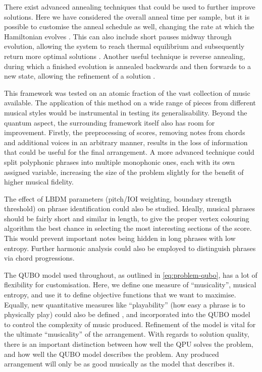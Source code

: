 \documentclass[12pt]{article}
\theoremstyle{definition}
\begin{document}
There exist advanced annealing techniques that could be used to further improve solutions. Here we have considered the overall anneal time per sample, but it is possible to customise the anneal schedule as well, changing the rate at which the Hamiltonian evolves \cite{khezri_customized_2022}. This can also include short pauses midway through evolution, allowing the system to reach thermal equilibrium and subsequently return more optimal solutions \cite{izquierdo_advantage_2022}. Another useful technique is reverse annealing, during which a finished evolution is annealed backwards and then forwards to a new state, allowing the refinement of a solution \cite{dwave_reverse}.

This framework was tested on an atomic fraction of the vast collection of music available. The application of this method on a wide range of pieces from different musical styles would be instrumental in testing its generalisability. Beyond the quantum aspect, the surrounding framework itself also has room for improvement. Firstly, the preprocessing of scores, removing notes from chords and additional voices in an arbitrary manner, results in the loss of information that could be useful for the final arrangement. A more advanced technique could split polyphonic phrases into multiple monophonic ones, each with its own assigned variable, increasing the size of the problem slightly for the benefit of higher musical fidelity.

The effect of LBDM parameters (pitch/IOI weighting, boundary strength threshold) on phrase identification could also be studied. Ideally, musical phrases should be fairly short and similar in length, to give the proper vertex colouring algorithm the best chance in selecting the most interesting sections of the score. This would prevent important notes being hidden in long phrases with low entropy. Further harmonic analysis could also be employed to distinguish phrases via chord progressions.

The QUBO model used throughout, as outlined in \cref{eq:problem-qubo}, has a lot of flexibility for customisation. Here, we define one measure of ``musicality'', musical entropy, and use it to define objective functions that we want to maximise. Equally, new quantitative measures like ``playability'' (how easy a phrase is to physically play) could also be defined \cite{nakamura_statistical_2018}, and incorporated into the QUBO model to control the complexity of music produced. Refinement of the model is vital for the ultimate ``musicality'' of the arrangement. With regards to solution quality, there is an important distinction between how well the QPU solves the problem, and how well the QUBO model describes the problem. Any produced arrangement will only be as good musically as the model that describes it.
\end{document}

